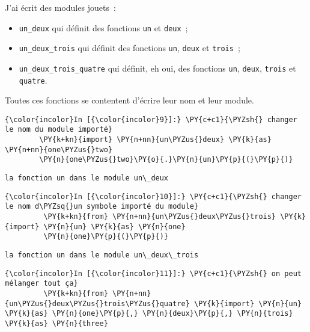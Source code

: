     J'ai écrit des modules jouets~:

\begin{itemize}
\tightlist
\item
  \texttt{un\_deux} qui définit des fonctions \texttt{un} et
  \texttt{deux}~;
\item
  \texttt{un\_deux\_trois} qui définit des fonctions \texttt{un},
  \texttt{deux} et \texttt{trois}~;
\item
  \texttt{un\_deux\_trois\_quatre} qui définit, eh oui, des fonctions
  \texttt{un}, \texttt{deux}, \texttt{trois} et \texttt{quatre}.
\end{itemize}

Toutes ces fonctions se contentent d'écrire leur nom et leur module.

    \begin{Verbatim}[commandchars=\\\{\},frame=single,framerule=0.3mm,rulecolor=\color{cellframecolor}]
{\color{incolor}In [{\color{incolor}9}]:} \PY{c+c1}{\PYZsh{} changer le nom du module importé}
        \PY{k+kn}{import} \PY{n+nn}{un\PYZus{}deux} \PY{k}{as} \PY{n+nn}{one\PYZus{}two}
        \PY{n}{one\PYZus{}two}\PY{o}{.}\PY{n}{un}\PY{p}{(}\PY{p}{)}
\end{Verbatim}


    \begin{Verbatim}[commandchars=\\\{\},frame=single,framerule=0.3mm,rulecolor=\color{cellframecolor}]
la fonction un dans le module un\_deux
\end{Verbatim}

    \begin{Verbatim}[commandchars=\\\{\},frame=single,framerule=0.3mm,rulecolor=\color{cellframecolor}]
{\color{incolor}In [{\color{incolor}10}]:} \PY{c+c1}{\PYZsh{} changer le nom d\PYZsq{}un symbole importé du module}
         \PY{k+kn}{from} \PY{n+nn}{un\PYZus{}deux\PYZus{}trois} \PY{k}{import} \PY{n}{un} \PY{k}{as} \PY{n}{one}
         \PY{n}{one}\PY{p}{(}\PY{p}{)}
\end{Verbatim}


    \begin{Verbatim}[commandchars=\\\{\},frame=single,framerule=0.3mm,rulecolor=\color{cellframecolor}]
la fonction un dans le module un\_deux\_trois
\end{Verbatim}

    \begin{Verbatim}[commandchars=\\\{\},frame=single,framerule=0.3mm,rulecolor=\color{cellframecolor}]
{\color{incolor}In [{\color{incolor}11}]:} \PY{c+c1}{\PYZsh{} on peut mélanger tout ça}
         \PY{k+kn}{from} \PY{n+nn}{un\PYZus{}deux\PYZus{}trois\PYZus{}quatre} \PY{k}{import} \PY{n}{un} \PY{k}{as} \PY{n}{one}\PY{p}{,} \PY{n}{deux}\PY{p}{,} \PY{n}{trois} \PY{k}{as} \PY{n}{three}
\end{Verbatim}


